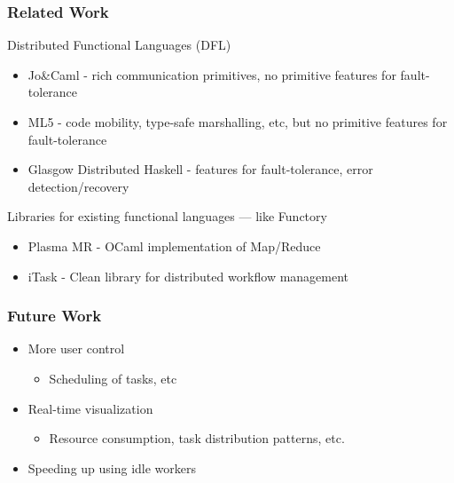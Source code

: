 \documentclass[xcolor=dvipsnames]{beamer}
\begin{document}
\begin{frame}\frametitle {Related Work}
  Distributed Functional Languages (DFL)
  \begin{itemize}
  \item Jo\&Caml - rich communication primitives, no primitive features
    for fault-tolerance
  \item ML5 - code mobility, type-safe marshalling, etc, but no
    primitive features for fault-tolerance
  \item Glasgow Distributed Haskell - features for fault-tolerance,
    error detection/recovery
  \end{itemize}


\bigskip
  Libraries for existing functional languages --- like Functory
  \begin{itemize}
  \item Plasma MR - OCaml implementation of Map/Reduce
  \item iTask - Clean library for distributed workflow management
  \end{itemize}

  
\end{frame}


\begin{frame}\frametitle {Future Work}
  \begin{itemize}
  \item More user control
    \begin{itemize}
    \item Scheduling of tasks, etc
    \end{itemize}


\bigskip
  \item Real-time visualization 
    \begin{itemize}
    \item Resource consumption, task distribution patterns, etc.
    \end{itemize}


\bigskip
  \item Speeding up using idle workers
  \end{itemize}
\end{frame}
\end{document}
